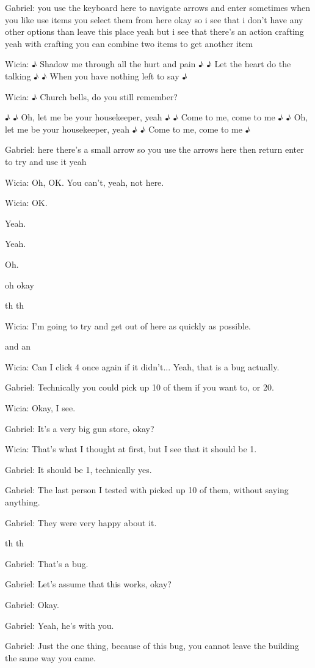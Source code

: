 Gabriel: you use the keyboard here to navigate arrows and enter sometimes when you like use items you select them from here okay so i see that i don't have any other options than leave this place yeah but i see that there's an action crafting yeah with crafting you can combine two items to get another item

Wicia: ♪ Shadow me through all the hurt and pain ♪ ♪ Let the heart do the talking ♪ ♪ When you have nothing left to say ♪

Wicia: ♪ Church bells, do you still remember?

♪ ♪ Oh, let me be your housekeeper, yeah ♪ ♪ Come to me, come to me ♪ ♪ Oh, let me be your housekeeper, yeah ♪ ♪ Come to me, come to me ♪

Gabriel: here there's a small arrow so you use the arrows here then return enter to try and use it yeah

Wicia: Oh, OK. You can't, yeah, not here.

Wicia: OK.

Yeah.

Yeah.

Oh.

oh okay

th th

Wicia: I'm going to try and get out of here as quickly as possible.

and an

Wicia: Can I click 4 once again if it didn't... Yeah, that is a bug actually.

Gabriel: Technically you could pick up 10 of them if you want to, or 20.

Wicia: Okay, I see.

Gabriel: It's a very big gun store, okay?

Wicia: That's what I thought at first, but I see that it should be 1.

Gabriel: It should be 1, technically yes.

Gabriel: The last person I tested with picked up 10 of them, without saying anything.

Gabriel: They were very happy about it.

th th

Gabriel: That's a bug.

Gabriel: Let's assume that this works, okay?

Gabriel: Okay.

Gabriel: Yeah, he's with you.

Gabriel: Just the one thing, because of this bug, you cannot leave the building the same way you came.

